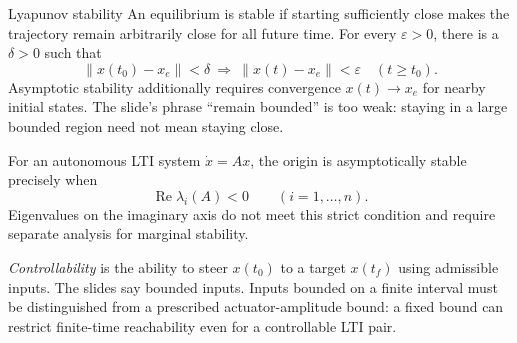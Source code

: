 \documentclass[11pt,a4paper]{article}
\numberwithin{equation}{section}
\numberwithin{figure}{section}
\numberwithin{table}{section}
\begin{document}
\begin{concept}{Lyapunov stability}
An equilibrium is stable if starting sufficiently close makes the trajectory remain arbitrarily close for all future time. For every $\varepsilon>0$, there is a $\delta>0$ such that
\[\|x(t_0)-x_e\|<\delta\ \Longrightarrow\ \|x(t)-x_e\|<\varepsilon\quad(t\ge t_0).\]
Asymptotic stability additionally requires convergence $x(t)\to x_e$ for nearby initial states. The slide's phrase ``remain bounded'' is too weak: staying in a large bounded region need not mean staying close.
\end{concept}
For an autonomous LTI system $\dot x=Ax$, the origin is asymptotically stable precisely when
\begin{equation}\label{eq:ctstable}\operatorname{Re}\lambda_i(A)<0\qquad(i=1,\ldots,n).\end{equation}
Eigenvalues on the imaginary axis do not meet this strict condition and require separate analysis for marginal stability.

\emph{Controllability} is the ability to steer $x(t_0)$ to a target $x(t_f)$ using admissible inputs. The slides say bounded inputs. Inputs bounded on a finite interval must be distinguished from a prescribed actuator-amplitude bound: a fixed bound can restrict finite-time reachability even for a controllable LTI pair.

\end{document}
